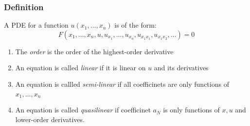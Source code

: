 \subsubsection{Definition}

%
\providecommand{\argmin}{\operatorname*{arg\,min}}%
\providecommand{\argmax}{\operatorname*{arg\,max}}%
\begin{definition}A PDE for a function $u(x_1,...,x_n)$ is of the form:
\begin{equation}
F(x_1,...,x_n, u,u_{x_1},...,u_{x_n},u_{x_1x_1},u_{x_1x_2},...)=0
\end{equation}

\begin{enumerate}
\item The \textit{order} is the order of the highest-order derivative
\item An equation is called \textit{linear} if it is linear on $u$ and its derivatives
\item An equation is callled \textit{semi-linear} if all coefficinets are only functions of $x_1,...,x_n$
\item An equation is called \textit{quasilinear} if coefficinet $a_N$ is only functions of $x,u$ and lower-order derivatives.
\end{enumerate}

\end{definition}